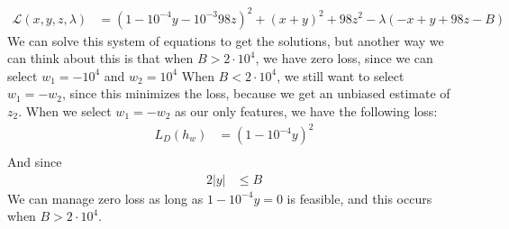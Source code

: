 \documentclass{amsart}
\theoremstyle{definition}
\begin{document}
\begin{enumerate}[(a)]
\begin{enumerate}[i.]
\begin{align*}
          \mathcal{L}(x, y, z, \lambda) &= \left(1 - 10^{-4} y - 10^{-3}98 z\right)^2 + (x + y)^2 + 98 z^2 - \lambda(-x + y + 98z - B)
        \end{align*}
        We can solve this system of equations to get the solutions, but another way we can think about this is that when $B > 2 \cdot 10^{4}$, we have zero loss, since we can select $w_1 = -10^{4}$ and $w_2 = 10^{4}$
        When $B < 2 \cdot 10^{4}$, we still want to select $w_1 = -w_2$, since this minimizes the loss, because we get an unbiased estimate of $z_2$.
        When we select $w_1 = -w_2$ as our only features, we have the following loss:
        \begin{align*}
          L_D(h_w) &= \left(1 - 10^{-4} y\right)^2\\
        \end{align*}
        And since 
        \begin{align*}
          2|y| &\le B
        \end{align*}
        We can manage zero loss as long as $1 - 10^{-4}y = 0$ is feasible, and this occurs when $B > 2 \cdot 10^{4}$.


\end{enumerate}
\end{enumerate}
\end{document}
